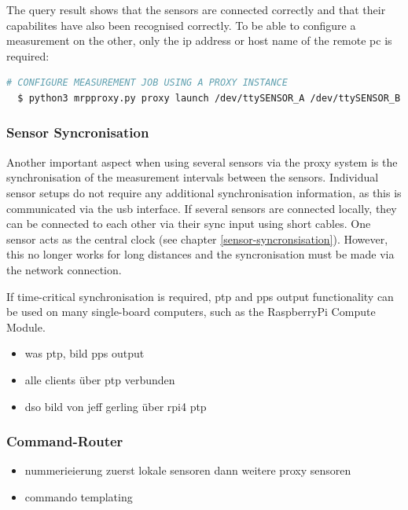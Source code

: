 The query result shows that the sensors are connected correctly and that
their capabilites have also been recognised correctly. To be able to
configure a measurement on the other, only the \gls{ip} address or host
name of the remote \gls{pc} is required:

\begin{lstlisting}[language=bash]
  # CONFIGURE MEASUREMENT JOB USING A PROXY INSTANCE
  $ python3 mrpproxy.py proxy launch /dev/ttySENSOR_A /dev/ttySENSOR_B
\end{lstlisting}

\hypertarget{sensor-syncronisation}{%
\subsubsection{Sensor Syncronisation}\label{sensor-syncronisation}}

Another important aspect when using several sensors via the proxy system
is the synchronisation of the measurement intervals between the sensors.
Individual sensor setups do not require any additional synchronisation
information, as this is communicated via the \gls{usb} interface. If
several sensors are connected locally, they can be connected to each
other via their sync input using short cables. One sensor acts as the
central clock (see chapter \ref{sensor-syncronsisation}). However, this
no longer works for long distances and the syncronisation must be made
via the network connection.

If time-critical synchronisation is required, \gls{ptp} and \gls{pps}
output functionality can be used on many single-board computers, such as
the RaspberryPi Compute Module.

\begin{itemize}
\tightlist
\item
  was ptp, bild pps output
\item
  alle clients über ptp verbunden
\item
  dso bild von jeff gerling über rpi4 ptp
\end{itemize}

\hypertarget{command-router}{%
\subsubsection{Command-Router}\label{command-router}}

\begin{itemize}
\tightlist
\item
  nummerieierung zuerst lokale sensoren dann weitere proxy sensoren
\item
  commando templating
\end{itemize}


